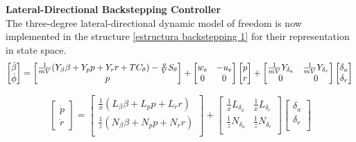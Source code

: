 \medskip

\textbf{Lateral-Directional Backstepping Controller}\\
The three-degree lateral-directional dynamic model of freedom is now implemented in the structure \ref{estructura backstepping 1} for their representation in state space.
\begin{equation}
    \begin{bmatrix}
        \dot \beta \\
        \dot \phi
    \end{bmatrix}
    =
    \begin{bmatrix}
        \frac{1}{mV} (Y_\beta \beta + Y_p p + Y_r r + T C_\theta) - \frac{g}{V} S_\theta \\
        p
    \end{bmatrix}
    +
    \begin{bmatrix}
    w_e & - u_e \\
    0 & 0
    \end{bmatrix}
    \begin{bmatrix}
      p  \\
      r
    \end{bmatrix}
    +
    \begin{bmatrix}
     \frac{1}{mV} Y_{\delta_a} & \frac{1}{mV} Y_{\delta_r} \\
      0 & 0 \\
    \end{bmatrix}
    \begin{bmatrix}
        \delta_{a} \\
        \delta_{r} \\
    \end{bmatrix} \nonumber\\
\end{equation}

\begin{equation}
    \begin{bmatrix}
        \dot p \\
        \dot r
    \end{bmatrix}
    =
    \begin{bmatrix}
        \frac{1}{x} (L_\beta \beta + L_p p + L_r r) \\
        \frac{1}{z} (N_\beta \beta + N_p p + N_r r) \\
    \end{bmatrix}
    +
    \begin{bmatrix}
      \frac{1}{x} L_{\delta_{a}} &  \frac{1}{x} L_{\delta_{r}} \\
      \frac{1}{z} N_{\delta_{a}} & \frac{1}{z} N_{\delta_{r}} \\
    \end{bmatrix}
    \begin{bmatrix}
        \delta_{a} \\
        \delta_{r} \\
    \end{bmatrix}
\end{equation}

